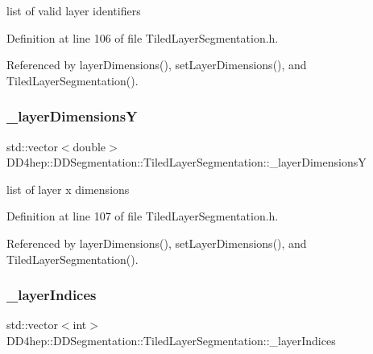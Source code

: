 list of valid layer identifiers 



Definition at line 106 of file Tiled\+Layer\+Segmentation.\+h.



Referenced by layer\+Dimensions(), set\+Layer\+Dimensions(), and Tiled\+Layer\+Segmentation().

\hypertarget{class_d_d4hep_1_1_d_d_segmentation_1_1_tiled_layer_segmentation_a48d863dc32788c26ddb770d88bb89f96}{}\label{class_d_d4hep_1_1_d_d_segmentation_1_1_tiled_layer_segmentation_a48d863dc32788c26ddb770d88bb89f96} 
\subsubsection{\texorpdfstring{\+\_\+layer\+DimensionsY}{\_layerDimensionsY}}
{\footnotesize\ttfamily std\+::vector$<$double$>$ D\+D4hep\+::\+D\+D\+Segmentation\+::\+Tiled\+Layer\+Segmentation\+::\+\_\+layer\+DimensionsY\hspace{0.3cm}{\ttfamily [protected]}}



list of layer x dimensions 



Definition at line 107 of file Tiled\+Layer\+Segmentation.\+h.



Referenced by layer\+Dimensions(), set\+Layer\+Dimensions(), and Tiled\+Layer\+Segmentation().

\hypertarget{class_d_d4hep_1_1_d_d_segmentation_1_1_tiled_layer_segmentation_a1988abb223b228480310aaf061d9210e}{}\label{class_d_d4hep_1_1_d_d_segmentation_1_1_tiled_layer_segmentation_a1988abb223b228480310aaf061d9210e} 
\subsubsection{\texorpdfstring{\+\_\+layer\+Indices}{\_layerIndices}}
{\footnotesize\ttfamily std\+::vector$<$int$>$ D\+D4hep\+::\+D\+D\+Segmentation\+::\+Tiled\+Layer\+Segmentation\+::\+\_\+layer\+Indices\hspace{0.3cm}{\ttfamily [protected]}}



